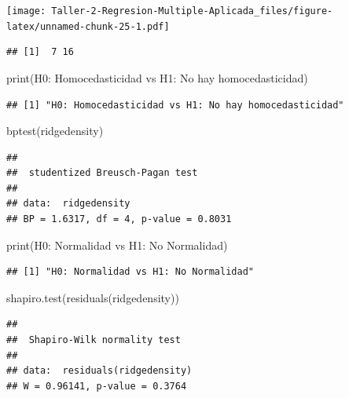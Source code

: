 \documentclass[
]{article}
\newenvironment{Shaded}{\begin{snugshade}}{\end{snugshade}}
\newcommand{\FunctionTok}[1]{\textcolor[rgb]{0.00,0.00,0.00}{#1}}
\newcommand{\NormalTok}[1]{#1}
\newcommand{\StringTok}[1]{\textcolor[rgb]{0.31,0.60,0.02}{#1}}
\begin{document}
\texttt{[image: Taller-2-Regresion-Multiple-Aplicada\_files/figure-latex/unnamed-chunk-25-1.pdf]}

\begin{verbatim}
## [1]  7 16
\end{verbatim}

\begin{Shaded}
\begin{Highlighting}[]
\FunctionTok{print}\NormalTok{(}\StringTok{\textquotesingle{}H0: Homocedasticidad vs H1: No hay homocedasticidad\textquotesingle{}}\NormalTok{)}
\end{Highlighting}
\end{Shaded}

\begin{verbatim}
## [1] "H0: Homocedasticidad vs H1: No hay homocedasticidad"
\end{verbatim}

\begin{Shaded}
\begin{Highlighting}[]
\FunctionTok{bptest}\NormalTok{(ridgedensity)}
\end{Highlighting}
\end{Shaded}

\begin{verbatim}
## 
##  studentized Breusch-Pagan test
## 
## data:  ridgedensity
## BP = 1.6317, df = 4, p-value = 0.8031
\end{verbatim}

\begin{Shaded}
\begin{Highlighting}[]
\FunctionTok{print}\NormalTok{(}\StringTok{\textquotesingle{}H0: Normalidad vs H1: No Normalidad\textquotesingle{}}\NormalTok{)}
\end{Highlighting}
\end{Shaded}

\begin{verbatim}
## [1] "H0: Normalidad vs H1: No Normalidad"
\end{verbatim}

\begin{Shaded}
\begin{Highlighting}[]
\FunctionTok{shapiro.test}\NormalTok{(}\FunctionTok{residuals}\NormalTok{(ridgedensity))}
\end{Highlighting}
\end{Shaded}

\begin{verbatim}
## 
##  Shapiro-Wilk normality test
## 
## data:  residuals(ridgedensity)
## W = 0.96141, p-value = 0.3764
\end{verbatim}
\end{document}
